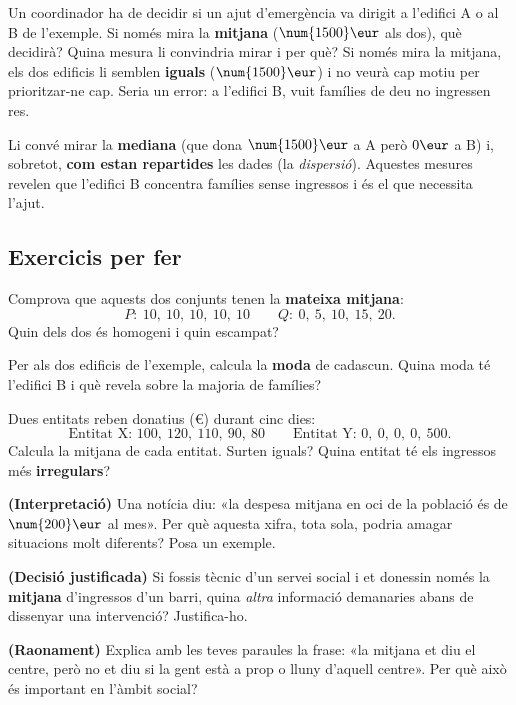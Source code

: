 \begin{exresolt}
Un coordinador ha de decidir si un ajut d'emergència va dirigit a l'edifici A o al B
de l'exemple. Si només mira la \textbf{mitjana} ($\num{1500}\eur$ als dos), què
decidirà? Quina mesura li convindria mirar i per què?
\solucio
Si només mira la mitjana, els dos edificis li semblen \textbf{iguals}
($\num{1500}\eur$) i no veurà cap motiu per prioritzar-ne cap. Seria un error: a
l'edifici B, vuit famílies de deu no ingressen res.

Li convé mirar la \textbf{mediana} (que dona $\num{1500}\eur$ a A però $0\eur$ a B) i,
sobretot, \textbf{com estan repartides} les dades (la \emph{dispersió}). Aquestes
mesures revelen que l'edifici B concentra famílies sense ingressos i és el que
necessita l'ajut.
\end{exresolt}

\subsection{Exercicis per fer}

\begin{exercicis}
\begin{exlist}
  \item Comprova que aquests dos conjunts tenen la \textbf{mateixa mitjana}:
        \[
        P:\ 10,\ 10,\ 10,\ 10,\ 10 \qquad Q:\ 0,\ 5,\ 10,\ 15,\ 20.
        \]
        Quin dels dos és homogeni i quin escampat?
  \item Per als dos edificis de l'exemple, calcula la \textbf{moda} de cadascun.
        Quina moda té l'edifici B i què revela sobre la majoria de famílies?
  \item Dues entitats reben donatius (€) durant cinc dies:
        \[
        \text{Entitat X: } 100,\ 120,\ 110,\ 90,\ 80 \qquad
        \text{Entitat Y: } 0,\ 0,\ 0,\ 0,\ 500.
        \]
        Calcula la mitjana de cada entitat. Surten iguals? Quina entitat té els
        ingressos més \textbf{irregulars}?
  \item \textbf{(Interpretació)} Una notícia diu: «la despesa mitjana en oci de la
        població és de $\num{200}\eur$ al mes». Per què aquesta xifra, tota sola,
        podria amagar situacions molt diferents? Posa un exemple.
  \item \textbf{(Decisió justificada)} Si fossis tècnic d'un servei social i et
        donessin només la \textbf{mitjana} d'ingressos d'un barri, quina \emph{altra}
        informació demanaries abans de dissenyar una intervenció? Justifica-ho.
  \item \textbf{(Raonament)} Explica amb les teves paraules la frase: «la mitjana et
        diu el centre, però no et diu si la gent està a prop o lluny d'aquell centre».
        Per què això és important en l'àmbit social?
\end{exlist}
\end{exercicis}

